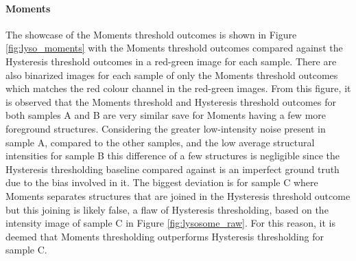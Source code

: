 \FloatBarrier
\paragraph{Moments}
The showcase of the Moments threshold outcomes is shown in Figure \ref{fig:lyso_moments} with the Moments threshold outcomes compared against the Hysteresis threshold outcomes in a red-green image for each sample. There are also binarized images for each sample of only the Moments threshold outcomes which matches the red colour channel in the red-green images. From this figure, it is observed that the Moments threshold and Hysteresis threshold outcomes for both samples A and B are very similar save for Moments having a few more foreground structures. Considering the greater low-intensity noise present in sample A, compared to the other samples, and the low average structural intensities for sample B this difference of a few structures is negligible since the Hysteresis thresholding baseline compared against is an imperfect ground truth due to the bias involved in it. The biggest deviation is for sample C where Moments separates structures that are joined in the Hysteresis threshold outcome but this joining is likely false, a flaw of Hysteresis thresholding, based on the intensity image of sample C in Figure \ref{fig:lysosome_raw}. For this reason, it is deemed that Moments thresholding outperforms Hysteresis thresholding for sample C.
